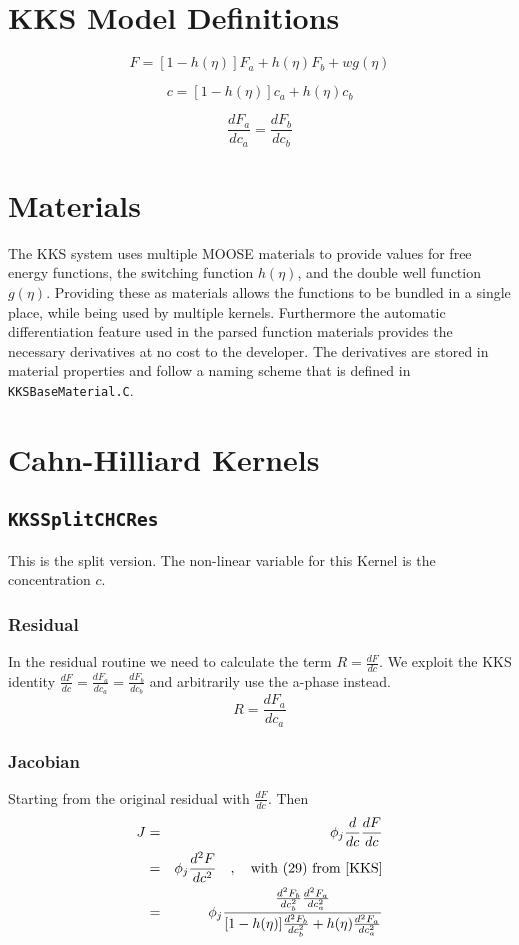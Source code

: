 \documentclass[]{article}
\begin{document}
\tableofcontents 
\section{KKS Model Definitions}

\[
F = [1-h(\eta)]F_a + h(\eta)F_b+wg(\eta) 
\]

\[
c =  [1-h(\eta)]c_a + h(\eta)c_b
\]

\[
\frac{dF_a}{dc_a} = \frac{dF_b}{dc_b}
\]

\section{Materials}
The KKS system uses multiple MOOSE materials to provide values for free energy functions, the switching function $h(\eta)$, and the double well function $g(\eta)$.
Providing these as materials allows the functions to be bundled in a single place, while being used by multiple kernels. Furthermore the automatic differentiation feature 
used in the parsed function materials provides the necessary derivatives at no cost to the developer. The derivatives are stored in material properties and follow a naming scheme 
that is defined in \texttt{KKSBaseMaterial.C}.

\section{Cahn-Hilliard Kernels}

\subsection{\texttt{KKSSplitCHCRes}}
This is the split version. The non-linear variable for this Kernel is the concentration $c$.

\subsubsection{Residual}

In the residual routine we need to calculate the term $R= \frac{dF}{dc}$. We exploit the KKS identity $\frac{dF}{dc}=\frac{dF_a}{dc_a}=\frac{dF_b}{dc_b}$ and arbitrarily use the a-phase instead.
\[
R = \frac{dF_a}{dc_a}
\]

\subsubsection{Jacobian}
Starting from the original residual with $\frac{dF}{dc}$. Then
\begin{eqnarray*}
J &=& \phi_j \frac{d}{dc} \frac{dF}{dc}\\
  &=& \phi_j  \frac{d^2F}{dc^2} \quad,\quad \text{with (29) from \cite{KKS}}\\
  &=& \phi_j  \frac{\frac{d^2F_b}{dc_b^2}\frac{d^2F_a}{dc_a^2}}{  [1-h(\eta)]\frac{d^2F_b}{dc_b^2}+h(\eta)\frac{d^2F_a}{dc_a^2} }\\
\end{eqnarray*}
\end{document}
